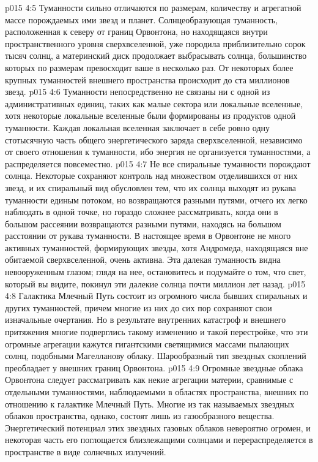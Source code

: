 \vs p015 4:5 \pc Туманности сильно отличаются по размерам, количеству и агрегатной массе порождаемых ими звезд и планет. Солнцеобразующая туманность, расположенная к северу от границ Орвонтона, но находящаяся внутри пространственного уровня сверхвселенной, уже породила приблизительно сорок тысяч солнц, а материнский диск продолжает выбрасывать солнца, большинство которых по размерам превосходит ваше в несколько раз. От некоторых более крупных туманностей внешнего пространства происходит до ста миллионов звезд.
\vs p015 4:6 Туманности непосредственно не связаны ни с одной из административных единиц, таких как малые сектора или локальные вселенные, хотя некоторые локальные вселенные были формированы из продуктов одной туманности. Каждая локальная вселенная заключает в себе ровно одну стотысячную часть общего энергетического заряда сверхвселенной, независимо от своего отношения к туманности, ибо энергия не организуется туманностями, а распределяется повсеместно.
\vs p015 4:7 Не все спиральные туманности порождают солнца. Некоторые сохраняют контроль над множеством отделившихся от них звезд, и их спиральный вид обусловлен тем, что их солнца выходят из рукава туманности единым потоком, но возвращаются разными путями, отчего их легко наблюдать в одной точке, но гораздо сложнее рассматривать, когда они в большом рассеянии возвращаются разными путями, находясь на большом расстоянии от рукава туманности. В настоящее время в Орвонтоне не много активных туманностей, формирующих звезды, хотя Андромеда, находящаяся вне обитаемой сверхвселенной, очень активна. Эта далекая туманность видна невооруженным глазом; глядя на нее, остановитесь и подумайте о том, что свет, который вы видите, покинул эти далекие солнца почти миллион лет назад.
\vs p015 4:8 Галактика Млечный Путь состоит из огромного числа бывших спиральных и других туманностей, причем многие из них до сих пор сохраняют свои изначальные очертания. Но в результате внутренних катастроф и внешнего притяжения многие подверглись такому изменению и такой перестройке, что эти огромные агрегации кажутся гигантскими светящимися массами пылающих солнц, подобными Магелланову облаку. Шарообразный тип звездных скоплений преобладает у внешних границ Орвонтона.
\vs p015 4:9 Огромные звездные облака Орвонтона следует рассматривать как некие агрегации материи, сравнимые с отдельными туманностями, наблюдаемыми в областях пространства, внешних по отношению к галактике Млечный Путь. Многие из так называемых звездных облаков пространства, однако, состоят лишь из газообразного вещества. Энергетический потенциал этих звездных газовых облаков невероятно огромен, и некоторая часть его поглощается близлежащими солнцами и перераспределяется в пространстве в виде солнечных излучений.
